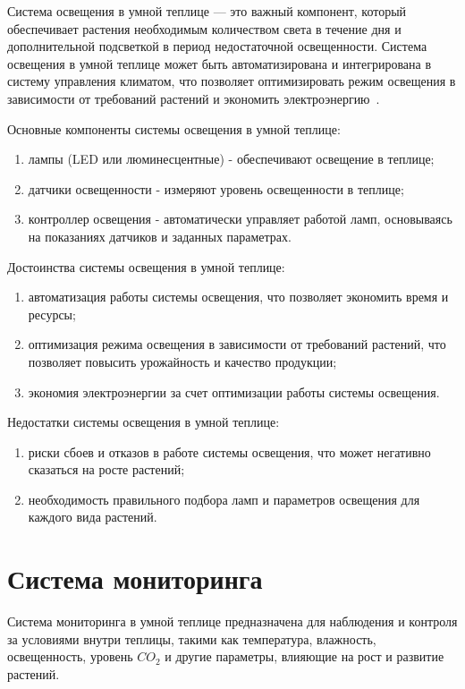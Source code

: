 Система освещения в умной теплице --- это важный компонент, который обеспечивает растения необходимым количеством света в течение дня и дополнительной подсветкой в период недостаточной освещенности. Система освещения в умной теплице может быть автоматизирована и интегрирована в систему управления климатом, что позволяет оптимизировать режим освещения в зависимости от требований растений и экономить электроэнергию~\cite{Light}.

Основные компоненты системы освещения в умной теплице:

\begin{enumerate}
    \item лампы (LED или люминесцентные) - обеспечивают освещение в теплице;
    \item датчики освещенности - измеряют уровень освещенности в теплице;
    \item контроллер освещения - автоматически управляет работой ламп, основываясь на показаниях датчиков и заданных параметрах.
\end{enumerate}

Достоинства системы освещения в умной теплице:

\begin{enumerate}
    \item автоматизация работы системы освещения, что позволяет экономить время и ресурсы;
    \item оптимизация режима освещения в зависимости от требований растений, что позволяет повысить урожайность и качество продукции;
    \item экономия электроэнергии за счет оптимизации работы системы освещения.
\end{enumerate}

Недостатки системы освещения в умной теплице:

\begin{enumerate}
    \item риски сбоев и отказов в работе системы освещения, что может негативно сказаться на росте растений;
    \item необходимость правильного подбора ламп и параметров освещения для каждого вида растений.
\end{enumerate}

\section{Система мониторинга}

Система мониторинга в умной теплице предназначена для наблюдения и контроля за условиями внутри теплицы, такими как температура, влажность, освещенность, уровень $CO_2$ и другие параметры, влияющие на рост и развитие растений.


